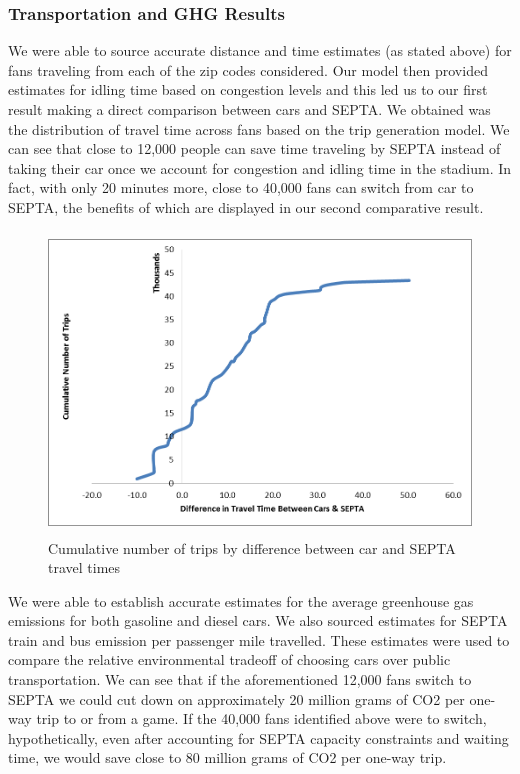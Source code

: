\subsubsection{Transportation and GHG Results}

We were able to source accurate distance and time estimates (as stated
above) for fans traveling from each of the zip codes considered. Our
model then provided estimates for idling time based on congestion
levels and this led us to our first result making a direct comparison
between cars and SEPTA. We obtained was the distribution of travel
time across fans based on the trip generation model. We can see that
close to 12,000 people can save time traveling by SEPTA instead of
taking their car once we account for congestion and idling time in the
stadium. In fact, with only 20 minutes more, close to 40,000 fans can
switch from car to SEPTA, the benefits of which are displayed in our
second comparative result.

\begin{figure}[htp]
  \centering
  \includegraphics[height=8cm]{graphics/graph1.png}
  \caption{Cumulative number of trips by difference between car and SEPTA travel times}
\end{figure}

We were able to establish accurate estimates for the average
greenhouse gas emissions for both gasoline and diesel cars. We also
sourced estimates for SEPTA train and bus emission per passenger mile
travelled. These estimates were used to compare the relative
environmental tradeoff of choosing cars over public transportation. We
can see that if the aforementioned 12,000 fans switch to SEPTA we
could cut down on approximately 20 million grams of CO2 per one-way
trip to or from a game. If the 40,000 fans identified above were to
switch, hypothetically, even after accounting for SEPTA capacity
constraints and waiting time, we would save close to 80 million grams
of CO2 per one-way trip.

